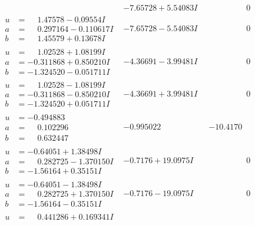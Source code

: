 \documentclass[1p]{elsarticle_modified}
\theoremstyle{definition}
\begin{document}
$$\begin{array}{c|c|c}
 & -7.65728 + 5.54083 I & \phantom{-0.000000 } 0 \\ \hline\begin{aligned}
u &= \phantom{-}1.47578 - 0.09554 I \\
a &= \phantom{-}0.297164 - 0.110617 I \\
b &= \phantom{-}1.45579 + 0.13678 I\end{aligned}
 & -7.65728 - 5.54083 I & \phantom{-0.000000 } 0 \\ \hline\begin{aligned}
u &= \phantom{-}1.02528 + 1.08199 I \\
a &= -0.311868 + 0.850210 I \\
b &= -1.324520 - 0.051711 I\end{aligned}
 & -4.36691 - 3.99481 I & \phantom{-0.000000 } 0 \\ \hline\begin{aligned}
u &= \phantom{-}1.02528 - 1.08199 I \\
a &= -0.311868 - 0.850210 I \\
b &= -1.324520 + 0.051711 I\end{aligned}
 & -4.36691 + 3.99481 I & \phantom{-0.000000 } 0 \\ \hline\begin{aligned}
u &= -0.494883\phantom{ +0.000000I} \\
a &= \phantom{-}0.102296\phantom{ +0.000000I} \\
b &= \phantom{-}0.632447\phantom{ +0.000000I}\end{aligned}
 & -0.995022\phantom{ +0.000000I} & -10.4170\phantom{ +0.000000I} \\ \hline\begin{aligned}
u &= -0.64051 + 1.38498 I \\
a &= \phantom{-}0.282725 - 1.370150 I \\
b &= -1.56164 + 0.35151 I\end{aligned}
 & -0.7176 + 19.0975 I & \phantom{-0.000000 } 0 \\ \hline\begin{aligned}
u &= -0.64051 - 1.38498 I \\
a &= \phantom{-}0.282725 + 1.370150 I \\
b &= -1.56164 - 0.35151 I\end{aligned}
 & -0.7176 - 19.0975 I & \phantom{-0.000000 } 0 \\ \hline\begin{aligned}
u &= \phantom{-}0.441286 + 0.169341 I \\

\end{aligned}
\end{array}$$
\end{document}
